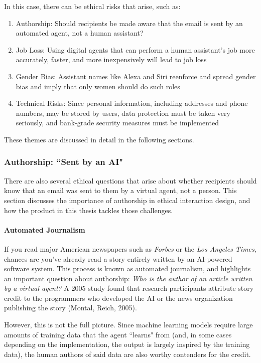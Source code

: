 \documentclass{article}
\begin{document}
In this case, there can be ethical risks that arise, such as:

\begin{enumerate}
 \item Authorship: Should recipients be made aware that the email is sent by an automated agent, not a human assistant?
 \item Job Loss: Using digital agents that can perform a human assistant's job more accurately, faster, and more inexpensively will lead to job loss
 \item Gender Bias: Assistant names like Alexa and Siri reenforce and spread gender bias and imply that only women should do such roles
 \item Technical Risks: Since personal information, including addresses and phone numbers, may be stored by users, data protection must be taken very seriously, and bank-grade security measures must be implemented
\end{enumerate}

These themes are discussed in detail in the following sections.

\subsubsection{Authorship: ``Sent by an AI"}

There are also several ethical questions that arise about whether recipients should know that an email was sent to them by a virtual agent, not a person. This section discusses the importance of authorship in ethical interaction design, and how the product in this thesis tackles those challenges.

\paragraph{Automated Journalism}


If you read major American newspapers such as \emph{Forbes} or the \emph{Los Angeles Times}, chances are you've already read a story entirely written by an AI-powered software system. This process is known as automated journalism, and highlights an important question about authorship: \emph{Who is the author of an article written by a virtual agent?} A 2005 study found that research participants attribute story credit to the programmers who developed the AI or the news organization publishing the story (Montal, Reich, 2005). 

However, this is not the full picture. Since machine learning models require large amounts of training data that the agent ``learns" from (and, in some cases depending on the implementation, the output is largely inspired by the training data), the human authors of said data are also worthy contenders for the credit.
\end{document}
